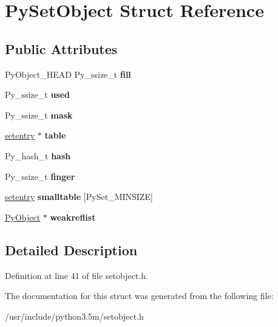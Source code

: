 \hypertarget{structPySetObject}{}\section{Py\+Set\+Object Struct Reference}
\label{structPySetObject}
\subsection*{Public Attributes}
\begin{DoxyCompactItemize}
\item 
Py\+Object\+\_\+\+H\+E\+AD Py\+\_\+ssize\+\_\+t {\bfseries fill}\hypertarget{structPySetObject_ab208cc20a13d9bdbec670998f33c681a}{}\label{structPySetObject_ab208cc20a13d9bdbec670998f33c681a}

\item 
Py\+\_\+ssize\+\_\+t {\bfseries used}\hypertarget{structPySetObject_a5490ae6336343dc5370b444e65658b68}{}\label{structPySetObject_a5490ae6336343dc5370b444e65658b68}

\item 
Py\+\_\+ssize\+\_\+t {\bfseries mask}\hypertarget{structPySetObject_a51774d9f28698ae52ce20710fa44d7dc}{}\label{structPySetObject_a51774d9f28698ae52ce20710fa44d7dc}

\item 
\hyperlink{structsetentry}{setentry} $\ast$ {\bfseries table}\hypertarget{structPySetObject_a86e11f8095545a3e6d0a2191f6b76af0}{}\label{structPySetObject_a86e11f8095545a3e6d0a2191f6b76af0}

\item 
Py\+\_\+hash\+\_\+t {\bfseries hash}\hypertarget{structPySetObject_a94ffef985efd5b978a350c8248a3373d}{}\label{structPySetObject_a94ffef985efd5b978a350c8248a3373d}

\item 
Py\+\_\+ssize\+\_\+t {\bfseries finger}\hypertarget{structPySetObject_ad4a04778894dde40cd1b17730f471795}{}\label{structPySetObject_ad4a04778894dde40cd1b17730f471795}

\item 
\hyperlink{structsetentry}{setentry} {\bfseries smalltable} \mbox{[}Py\+Set\+\_\+\+M\+I\+N\+S\+I\+ZE\mbox{]}\hypertarget{structPySetObject_a1e57b39fafc349cec4c423397ce05cc5}{}\label{structPySetObject_a1e57b39fafc349cec4c423397ce05cc5}

\item 
\hyperlink{struct__object}{Py\+Object} $\ast$ {\bfseries weakreflist}\hypertarget{structPySetObject_a18035d8fd033ae372267563d41fa217b}{}\label{structPySetObject_a18035d8fd033ae372267563d41fa217b}

\end{DoxyCompactItemize}


\subsection{Detailed Description}


Definition at line 41 of file setobject.\+h.



The documentation for this struct was generated from the following file\+:\begin{DoxyCompactItemize}
\item 
/usr/include/python3.\+5m/setobject.\+h\end{DoxyCompactItemize}
